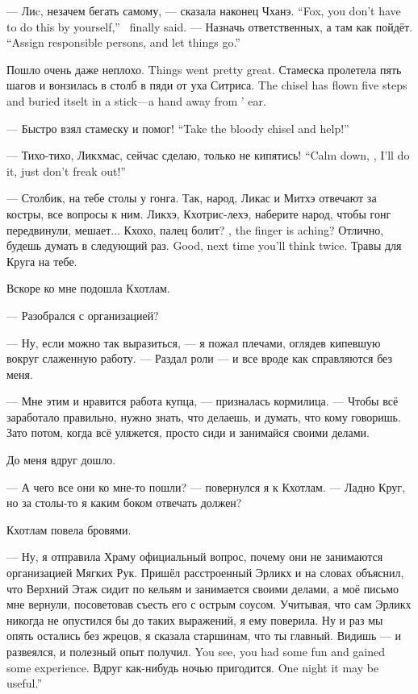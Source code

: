 {--- Лиc, незачем бегать самому, --- сказала наконец Чханэ.}
{``Fox, you don't have to do this by yourself,'' \Chhanei\ finally said.}
{--- Назначь ответственных, а там как пойдёт.}
{``Assign responsible persons, and let things go.''}

{Пошло очень даже неплохо.}
{Things went pretty great.}
{Стамеска пролетела пять шагов и вонзилась в столб в пяди от уха Ситриса.}
{The chisel has flown five steps and buried itselt in a stick---a hand away from \Sitris' ear.}

{--- Быстро взял стамеску и помог!}
{``Take the bloody chisel and help!''}

{--- Тихо-тихо, Ликхмас, сейчас сделаю, только не кипятись!}
{``Calm down, \Likchmas, I'll do it, just don't freak out!''}

--- Столбик, на тебе столы у гонга.
Так, народ, Ликас и Митхэ отвечают за костры, все вопросы к ним.
Ликхэ, Кхотрис-лехэ, наберите народ, чтобы гонг передвинули, мешает...
{Кхохо, палец болит?}
{\Kchoho, the finger is aching?}
{Отлично, будешь думать в следующий раз.}
{Good, next time you'll think twice.}
Травы для Круга на тебе.

Вскоре ко мне подошла Кхотлам.

--- Разобрался с организацией?

--- Ну, если можно так выразиться, --- я пожал плечами, оглядев кипевшую вокруг слаженную работу.
--- Раздал роли --- и все вроде как справляются без меня.

--- Мне этим и нравится работа купца, --- призналась кормилица.
--- Чтобы всё заработало правильно, нужно знать, что делаешь, и думать, что кому говоришь.
Зато потом, когда всё уляжется, просто сиди и занимайся своими делами.

До меня вдруг дошло.

--- А чего все они ко мне-то пошли? --- повернулся я к Кхотлам.
--- Ладно Круг, но за столы-то я каким боком отвечать должен?

Кхотлам повела бровями.

--- Ну, я отправила Храму официальный вопрос, почему они не занимаются организацией Мягких Рук.
Пришёл расстроенный Эрликх и на словах объяснил, что Верхний Этаж сидит по кельям и занимается своими делами, а моё письмо мне вернули, посоветовав съесть его с острым соусом.
Учитывая, что сам Эрликх никогда не опустился бы до таких выражений, я ему поверила.
Ну и раз мы опять остались без жрецов, я сказала старшинам, что ты главный.
{Видишь --- и развеялся, и полезный опыт получил.}
{You see, you had some fun and gained some experience.}
{Вдруг как-нибудь ночью пригодится.}
{One night it may be useful.''}

